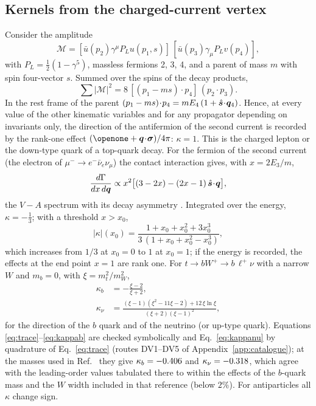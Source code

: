 \subsection{Kernels from the charged-current vertex}
\label{sec:va}

Consider the amplitude
\begin{equation}
\mathcal{M}=[\bar u(p_2)\gamma^\mu P_Lu(p_1,s)]\,[\bar u(p_3)\gamma_\mu P_Lv(p_4)],
\label{eq:amp}
\end{equation}
with $P_L=\tfrac12(1-\gamma^5)$, massless fermions 2, 3, 4, and a parent of mass $m$ with spin four-vector $s$. Summed over the spins of the decay products,
\begin{equation}
\sum|\mathcal{M}|^2=8\,[(p_1-ms)\!\cdot\!p_4]\,(p_2\!\cdot\!p_3).
\label{eq:trace}
\end{equation}
In the rest frame of the parent $(p_1-ms)\!\cdot\!p_4=mE_4\,(1+\hat{\bm s}\!\cdot\!\bm{q}_4)$. Hence, at every value of the other kinematic variables and for any propagator depending on invariants only, the direction of the antifermion of the second current is recorded by the rank-one effect $(\openone+\bq\!\cdot\!\bsig)/4\pi$: $\kappa=1$. This is the charged lepton or the down-type quark of a top-quark decay. For the fermion of the second current (the electron of $\mu^-\to e^-\bar\nu_e\nu_\mu$) the contact interaction gives, with $x=2E_3/m$,
\begin{equation}
\frac{d\Gamma}{dx\,d\bm{q}}\propto x^2\big[(3-2x)-(2x-1)\,\hat{\bm s}\!\cdot\!\bm{q}\big],
\label{eq:michel}
\end{equation}
the $V\!-\!A$ spectrum with its decay asymmetry \cite{michel1950,kinoshita1957}. Integrated over the energy, $\kappa=-\tfrac13$; with a threshold $x>x_0$,
\begin{equation}
|\kappa|(x_0)=\frac{1+x_0+x_0^2+3x_0^3}{3\,(1+x_0+x_0^2-x_0^3)} ,
\label{eq:kappacut}
\end{equation}
which increases from $1/3$ at $x_0=0$ to $1$ at $x_0=1$; if the energy is recorded, the effects at the end point $x=1$ are rank one. For $t\to bW^+\to b\,\ell^+\nu$ with a narrow $W$ and $m_b=0$, with $\xi=m_t^2/m_W^2$,
\begin{align}
\kappa_b&=-\frac{\xi-2}{\xi+2},\label{eq:kappab}\\
\kappa_\nu&=\frac{(\xi-1)(\xi^2-11\xi-2)+12\,\xi\ln\xi}{(\xi+2)(\xi-1)^2},\label{eq:kappanu}
\end{align}
for the direction of the $b$ quark and of the neutrino (or up-type quark). Equations \eqref{eq:trace}--\eqref{eq:kappab} are checked symbolically and Eq.~\eqref{eq:kappanu} by quadrature of Eq.~\eqref{eq:trace} (routes DV1--DV5 of Appendix~\ref{app:catalogue}); at the masses used in Ref.~\cite{brandenburg2002} they give $\kappa_b=-0.406$ and $\kappa_\nu=-0.318$, which agree with the leading-order values tabulated there to within the effects of the $b$-quark mass and the $W$ width included in that reference (below $2\%$). For antiparticles all $\kappa$ change sign.

